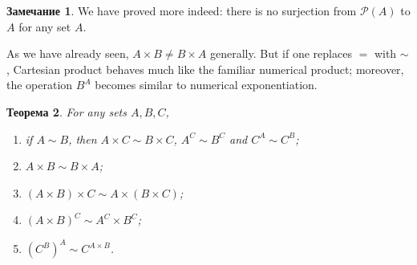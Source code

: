 \documentclass[12pt,notitlepage]{article}
\theoremstyle{plain}
\newtheorem{thm}{Теорема}[section]
\theoremstyle{definition}
\newtheorem{rem}[thm]{Замечание}
\theoremstyle{plain}
\newcommand{\mP}{\mathcal{P}}
\newcommand{\1}{\mathbf{1}}
\newcommand{\0}{\mathbf{0}}
\newcommand{\mcomm}[1]{}
\begin{document}
\begin{rem}
	We have proved more indeed: there is no surjection from $\mP(A)$ to $A$ for any set $A$.
\end{rem}

As we have already seen, $A \times B \neq B \times A$ generally. But if one replaces ${=}$ with ${\sim}$, Cartesian product behaves much like the familiar numerical product; moreover, the operation $B^A$ becomes similar to numerical exponentiation.

\mcomm{The following theorem can spare a lot of effort when proving set equivalence as Example~\ref{eq_sets:big_exm} shows. So, it is recommended to highlight this result and make the students remember its statement. It depends on the audience whether it is worth a detailed proof.}
\begin{thm}\label{ch0:bi_power}
	For any sets $A, B, C$,
	\begin{enumerate}
		\item if $A \sim B$, then $A \times C \sim B \times C$, $A^C \sim B^C$ and $C^A \sim C^B$;
		\item $A \times B \sim B \times A$;
		\item $(A \times B) \times C \sim A \times (B \times C)$;
		\item $(A\times B)^C \sim A^C \times B^C$;
		\item $(C^B)^A \sim C^{A \times B}$.
	\end{enumerate}
\end{thm}
\end{document}
